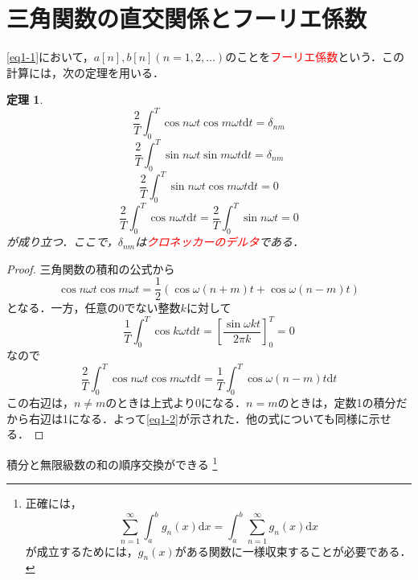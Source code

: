 \documentclass[a4j]{jsbook}
\newtheorem{theorem}{定理}
\numberwithin{theorem}{chapter}  %
\begin{document}
\section{三角関数の直交関係とフーリエ係数} \label{sec1-2}
\eqref{eq1-1}において，\(a[n], b[n](n=1, 2, \dots)\)のことを\textcolor{red}{フーリエ係数}という．この計算には，次の定理を用いる．
\begin{theorem}
\label{th1-1}
\begin{equation}
    \frac{2}{T}\int_0^T \cos n\omega t\cos m\omega t\mathrm{d}t=\delta_{nm} \label{eq1-2}
\end{equation}
\begin{equation}
    \frac{2}{T}\int_0^T \sin n\omega t\sin m\omega t\mathrm{d}t=\delta_{nm} \label{eq1-3}
\end{equation}
\begin{equation}
    \frac{2}{T}\int_0^T \sin n\omega t\cos m\omega t\mathrm{d}t=0 \label{eq1-4}
\end{equation}
\begin{equation}
    \frac{2}{T}\int_0^T \cos n\omega t\mathrm{d}t=\frac{2}{T}\int_0^T \sin n\omega t=0 \label{eq1-5}
\end{equation}
が成り立つ．ここで，\(\delta_{nm}\)は\textcolor{red}{クロネッカーのデルタ}である．
\end{theorem}
\begin{proof}
三角関数の積和の公式から
\begin{equation*}
    \cos n\omega t\cos m\omega t=\frac{1}{2}\left(\cos\omega(n+m)t+\cos\omega(n-m)t\right)
\end{equation*}
となる．一方，任意の0でない整数\(k\)に対して
\begin{equation*}
    \frac{1}{T}\int_0^T\cos k\omega t\mathrm{d}t=\left[\frac{\sin\omega kt}{2\pi k}\right]_0^T=0
\end{equation*}
なので
\begin{equation*}
    \frac{2}{T}\int_0^T \cos n\omega t\cos m\omega t\mathrm{d}t=\frac{1}{T}\int_0^T \cos\omega(n-m)t\mathrm{d}t
\end{equation*}
この右辺は，\(n\neq m\)のときは上式より0になる．\(n=m\)のときは，定数1の積分だから右辺は1になる．よって\eqref{eq1-2}が示された．他の式についても同様に示せる．
\end{proof}
積分と無限級数の和の順序交換ができる
\footnote{
正確には，
\begin{equation*}
    \sum_{n=1}^\infty\int_a^b g_n(x)\mathrm{d}x=\int_a^b\sum_{n=1}^\infty g_n(x)\mathrm{d}x
\end{equation*}
が成立するためには，\(g_n(x)\)がある関数に一様収束することが必要である．
}
\end{document}
